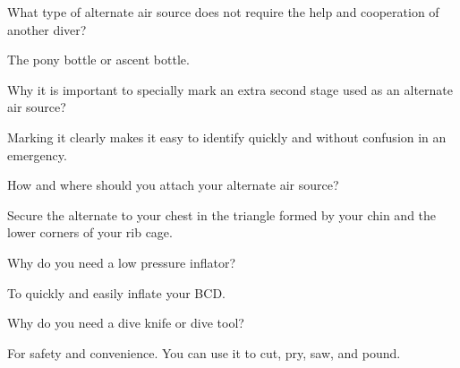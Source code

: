 	\begin{qanda}
		\begin{question}
What type of alternate air source does not require the help and cooperation of another diver?
		\end{question}

		\begin{answer}
The pony bottle or ascent bottle.
		\end{answer}
	\end{qanda}

	\begin{qanda}
		\begin{question}
Why it is important to specially mark an extra second stage used as an alternate air source?%
		\end{question}

		\begin{answer}
Marking it clearly makes it easy to identify quickly and without confusion in an emergency.%
		\end{answer}
	\end{qanda}

	\begin{qanda}
		\begin{question}
How and where should you attach your alternate air source?
		\end{question}

		\begin{answer}
Secure the alternate to your chest in the triangle formed by your chin and the lower corners of your rib cage.
		\end{answer}
	\end{qanda}

	\begin{qanda}
		\begin{question}
Why do you need a low pressure inflator?
		\end{question}

		\begin{answer}
To quickly and easily inflate your BCD.
		\end{answer}
	\end{qanda}

	\begin{qanda}
		\begin{question}
Why do you need a dive knife or dive tool?
		\end{question}

		\begin{answer}
For safety and convenience.  You can use it to cut, pry, saw, and pound.
		\end{answer}
	\end{qanda}

